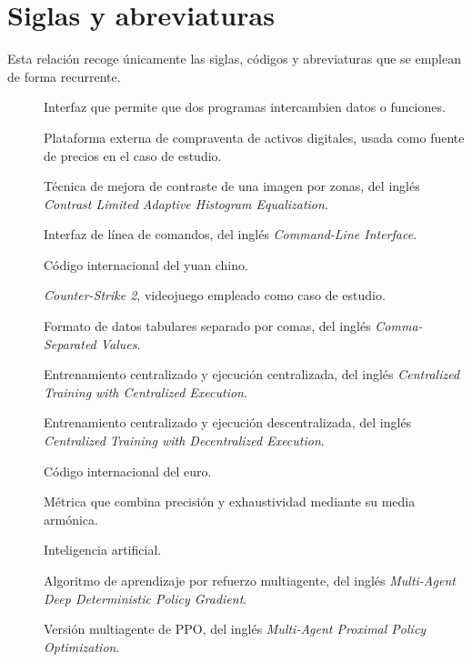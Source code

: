 \chapter*{Siglas y abreviaturas}
\indicetoprule

Esta relación recoge únicamente las siglas, códigos y abreviaturas que se emplean de forma recurrente.
\begin{description}
  \item[] Interfaz que permite que dos programas intercambien datos o funciones.
  \item[] Plataforma externa de compraventa de activos digitales, usada como fuente de precios en el caso de estudio.
  \item[] Técnica de mejora de contraste de una imagen por zonas, del inglés \emph{Contrast Limited Adaptive Histogram Equalization}.
  \item[] Interfaz de línea de comandos, del inglés \emph{Command-Line Interface}.
  \item[] Código internacional del yuan chino.
  \item[] \emph{Counter-Strike 2}, videojuego empleado como caso de estudio.
  \item[] Formato de datos tabulares separado por comas, del inglés \emph{Comma-Separated Values}.
  \item[] Entrenamiento centralizado y ejecución centralizada, del inglés \emph{Centralized Training with Centralized Execution}.
  \item[] Entrenamiento centralizado y ejecución descentralizada, del inglés \emph{Centralized Training with Decentralized Execution}.
  \item[] Código internacional del euro.
  \item[] Métrica que combina precisión y exhaustividad mediante su media armónica.
  \item[] Inteligencia artificial.
  \item[] Algoritmo de aprendizaje por refuerzo multiagente, del inglés \emph{Multi-Agent Deep Deterministic Policy Gradient}.
  \item[] Versión multiagente de PPO, del inglés \emph{Multi-Agent Proximal Policy Optimization}.

\end{description}
